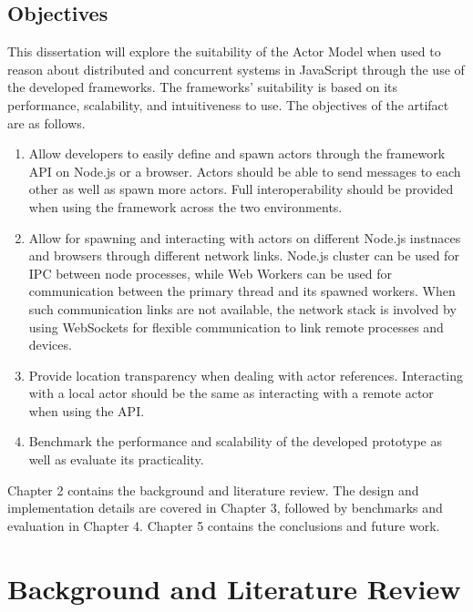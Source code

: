 \documentclass[oneside]{um-fict}
\begin{document}
\section{Objectives}
This dissertation will explore the suitability of the Actor Model when used to reason about distributed and concurrent systems in JavaScript through the use of the developed frameworks. The frameworks' suitability is based on its performance, scalability, and intuitiveness to use. The objectives of the artifact are as follows.
\begin{enumerate}
    \item Allow developers to easily define and spawn actors through the framework API on Node.js or a browser. Actors should be able to send messages to each other as well as spawn more actors. Full interoperability should be provided when using the framework across the two environments.
    \item Allow for spawning and interacting with actors on different Node.js instnaces and browsers through different network links. Node.js cluster\cite{cluster} can be used for IPC between node processes, while Web Workers\cite{webworkers} can be used for communication between the primary thread and its spawned workers. When such communication links are not available, the network stack is involved by using WebSockets for flexible communication to link remote processes and devices.
    \item Provide location transparency when dealing with actor references. Interacting with a local actor should be the same as interacting with a remote actor when using the API.
    \item Benchmark the performance and scalability of the developed prototype as well as evaluate its practicality.
\end{enumerate}

Chapter 2 contains the background and literature review. The design and implementation details are covered in Chapter 3, followed by benchmarks and evaluation in Chapter 4. Chapter 5 contains the conclusions and future work.

\chapter{Background and Literature Review}
\end{document}
